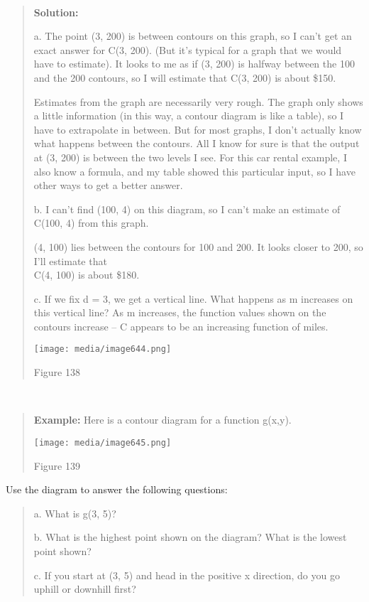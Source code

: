 \textbf{\\
}

\begin{quote}
\textbf{Solution:}

a. The point (3, 200) is between contours on this graph, so I can't get
an exact answer for C(3, 200). (But it's typical for a graph that we
would have to estimate). It looks to me as if (3, 200) is halfway
between the 100 and the 200 contours, so I will estimate that C(3, 200)
is about \$150.

Estimates from the graph are necessarily very rough. The graph only
shows a little information (in this way, a contour diagram is like a
table), so I have to extrapolate in between. But for most graphs, I
don't actually know what happens between the contours. All I know for
sure is that the output at (3, 200) is between the two levels I see. For
this car rental example, I also know a formula, and my table showed this
particular input, so I have other ways to get a better answer.

b. I can't find (100, 4) on this diagram, so I can't make an estimate of
C(100, 4) from this graph.

(4, 100) lies between the contours for 100 and 200. It looks closer to
200, so I'll estimate that\\
C(4, 100) is about \$180.

c. If we fix d = 3, we get a vertical line. What happens as m increases
on this vertical line? As m increases, the function values shown on the
contours increase -- C appears to be an increasing function of miles.

\texttt{[image: media/image644.png]}

Figure 138
\end{quote}

\textbf{\\
}

\begin{quote}
\textbf{Example:} Here is a contour diagram for a function g(x,y).

\texttt{[image: media/image645.png]}

Figure 139
\end{quote}

Use the diagram to answer the following questions:

\begin{quote}
a. What is g(3, 5)?

b. What is the highest point shown on the diagram? What is the lowest
point shown?

c. If you start at (3, 5) and head in the positive x direction, do you
go uphill or downhill first?
\end{quote}

